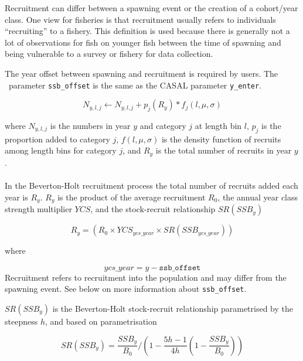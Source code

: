 Recruitment can differ between a spawning event or the creation of a cohort/year class. One view for fisheries is that recruitment usually refers to individuals \enquote{recruiting} to a fishery. This definition is used because there is generally not a lot of observations for fish on younger fish between the time of spawning and being vulnerable to a survey or fishery for data collection.


The year offset between spawning and recruitment is required by users. The \CNAME\ parameter \texttt{ssb\_offset} is the same as the CASAL parameter \texttt{y\_enter}.


\begin{equation}
N_{y,l,j} \leftarrow N_{y,l,j} + p_j(R_y) * f_j(l,\mu, \sigma)
\end{equation}

where $N_{y,l,j}$ is the numbers in year $y$ and category $j$ at length bin $l$, $p_j$ is the proportion added to category $j$, \(f(l,\mu, \sigma)\) is the density function of recruits among length bins for category \(j\), and $R_y$ is the total number of recruits in year $y$.


\paragraph{}\label{sec:Process-Length-RecruitmentBevertonHolt}

In the Beverton-Holt recruitment process the total number of recruits added each year is $R_y$. $R_y$ is the product of the average recruitment $R_0$, the annual year class strength multiplier $YCS$, and the stock-recruit relationship $SR(SSB_y)$

\begin{equation}\label{eq:BH}
R_{y} = (R_0 \times YCS_{ycs\_year} \times SR(SSB_{ycs\_year}))
\end{equation}

where

\begin{equation}\label{eq:year_class}
ycs\_year = y - \texttt{ssb\_offset}
\end{equation}
Recruitment refers to recruitment into the population and may differ from the spawning event. See below on more information about \texttt{ssb\_offset}.

$SR(SSB_y)$ is the Beverton-Holt stock-recruit relationship parametrised by the steepness $h$, and based on \cite{mace_doonan_88} parametrisation

\begin{equation}\label{eq:BH_SR}
SR(SSB_y) = \frac{SSB_y}{B_0} / \left( 1-\frac{5h-1}{4h} \left( 1-\frac{SSB_y}{B_0} \right) \right)
\end{equation}

